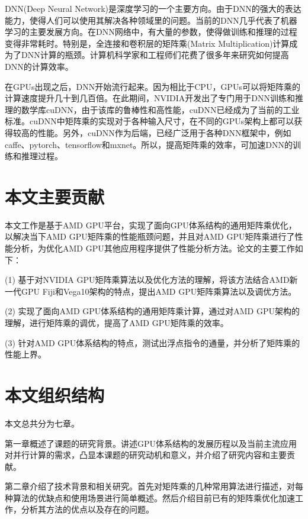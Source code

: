 DNN(Deep Neural Network)是深度学习的一个主要方向。由于DNN的强大的表达能力，使得人们可以使用其解决各种领域里的问题。当前的DNN几乎代表了机器学习的主要发展方向。在DNN网络中，有大量的参数，使得做训练和推理的过程变得非常耗时。特别是，全连接和卷积层的矩阵乘(Matrix Multiplication)计算成为了DNN计算的瓶颈。计算机科学家和工程师们花费了很多年来研究如何提高DNN的计算效率。

在GPUs出现之后，DNN开始流行起来。因为相比于CPU，GPUs可以将矩阵乘的计算速度提升几十到几百倍。在此期间，NVIDIA开发出了专门用于DNN训练和推理的数学库cuDNN，由于该库的鲁棒性和高性能，cuDNN已经成为了当前的工业标准。cuDNN中矩阵乘的实现对于各种输入尺寸，在不同的GPUs架构上都可以获得较高的性能。另外，cuDNN作为后端，已经广泛用于各种DNN框架中，例如caffe、pytorch、tensorflow和mxnet。所以，提高矩阵乘的效率，可加速DNN的训练和推理过程。


\section{本文主要贡献}
本文工作是基于AMD GPU平台，实现了面向GPU体系结构的通用矩阵乘优化，以解决当下AMD GPU矩阵乘的性能瓶颈问题，并且对AMD GPU矩阵乘进行了性能分析，为优化AMD GPU其他应用程序提供了性能分析方法。论文的主要工作如下：

%

 (1) 基于对NVIDIA GPU矩阵乘算法以及优化方法的理解，将该方法结合AMD新一代GPU Fiji和Vega10架构的特点，提出AMD GPU矩阵乘算法以及调优方法。

 (2) 实现了面向AMD GPU体系结构的通用矩阵乘计算，通过对AMD GPU架构的理解，进行矩阵乘的调优，提高了AMD GPU矩阵乘的效率。

 (3) 针对AMD GPU体系结构的特点，测试出浮点指令的通量，并分析了矩阵乘的性能上界。


\section{本文组织结构}
本文总共分为七章。

第一章概述了课题的研究背景。讲述GPU体系结构的发展历程以及当前主流应用对并行计算的需求，凸显本课题的研究动机和意义，并介绍了研究内容和主要贡献。

第二章介绍了技术背景和相关研究。首先对矩阵乘的几种常用算法进行描述，对每种算法的优缺点和使用场景进行简单概述。然后介绍目前已有的矩阵乘优化加速工作，分析其方法的优点以及存在的问题。

